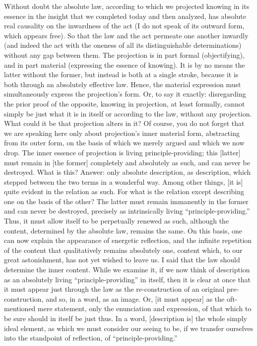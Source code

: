 Without doubt the absolute law,
according to which we projected knowing
in its essence in the insight
that we completed today and then analyzed,
has absolute real causality on the inwardness of the act
(I do not speak of its outward form, which appears free).
So that the law and the act permeate one another inwardly
(and indeed the act with the oneness of
all its distinguishable determinations)
without any gap between them.
The projection is in part formal (objectifying),
and in part material (expressing the essence of knowing).
It is by no means the latter without the former,
but instead is both at a single stroke,
because it is both through an absolutely effective law.
Hence, the material expression must
simultaneously express the projection's form.
Or, to say it exactly:
disregarding the prior proof of the opposite,
knowing in projection, at least formally,
cannot simply be just what it is in itself or
according to the law, without any projection.
What could it be that projection alters in it?
Of course, you do not forget that we are speaking here only about
projection's inner material form,
abstracting from its outer form,
on the basis of which we merely argued and which we now drop.
The inner essence of projection is living principle-providing;
this [latter] must remain in [the former]
completely and absolutely as such, and can never be destroyed.
What is this?
Answer: only absolute description, as description,
which stepped between the two terms in a wonderful way.
Among other things, [it is] quite evident in the relation as such.
For what is the relation except
describing one on the basis of the other?
The latter must remain immanently in the former
and can never be destroyed,
precisely as intrinsically living “principle-providing.”
Thus, it must allow itself to be
perpetually renewed as such, although the content,
determined by the absolute law, remains the same.
On this basis, one can now explain the appearance of
energetic reflection, and the infinite repetition of
the content that qualitatively remains absolutely one,
content which, to our great astonishment,
has not yet wished to leave us.
I said that the law should determine the inner content.
While we examine it, if we now think of description as
an absolutely living “principle-providing” in itself,
then it is clear at once that it must appear just through the law
as the re-construction of an original pre-construction,
and so, in a word, as an image.
Or, [it must appear] as the oft-mentioned mere statement,
only the enunciation and expression,
of that which to be sure should in itself be just thus.
In a word, [description is] the whole simply ideal element,
as which we must consider our seeing to be,
if we transfer ourselves into the standpoint of reflection,
of “principle-providing.”

